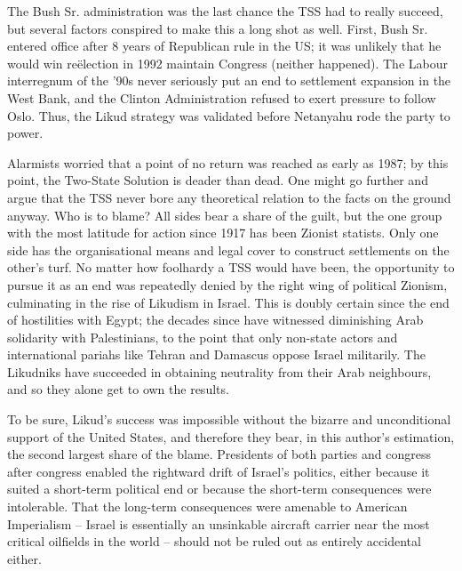 \documentclass[letterpaper,12pt,twoside]{article} %
\begin{document}
\begin{multicols}{2}
The Bush Sr. administration was the last chance the TSS had to really succeed, but several factors conspired to make this a long shot as well. First, Bush Sr. entered office after 8 years of Republican rule in the US; it was unlikely that he would win reëlection in 1992  maintain Congress (neither happened). The Labour interregnum of the '90s never seriously put an end to settlement expansion in the West Bank, and the Clinton Administration refused to exert pressure to follow Oslo. Thus, the Likud strategy was validated before Netanyahu rode the party to power.

Alarmists worried that a point of no return was reached as early as 1987; by this point, the Two-State Solution is deader than dead. One might go further and argue that the TSS never bore any theoretical relation to the facts on the ground anyway. Who is to blame? All sides bear a share of the guilt, but the one group with the most latitude for action since 1917 has been Zionist statists. Only one side has the organisational means and legal cover to construct settlements on the other's turf. No matter how foolhardy a TSS would have been, the opportunity to pursue it as an end was repeatedly denied by the right wing of political Zionism, culminating in the rise of Likudism in Israel. This is doubly certain since the end of hostilities with Egypt; the decades since have witnessed diminishing Arab solidarity with Palestinians, to the point that only non-state actors and international pariahs like Tehran and Damascus oppose Israel militarily. The Likudniks have succeeded in obtaining neutrality from their Arab neighbours, and so they alone get to own the results.

To be sure, Likud's success was impossible without the bizarre and unconditional support of the United States, and therefore they bear, in this author's estimation, the second largest share of the blame. Presidents of both parties and congress after congress enabled the rightward drift of Israel's politics, either because it suited a short-term political end or because the short-term consequences were intolerable. That the long-term consequences were amenable to American Imperialism -- Israel is essentially an unsinkable aircraft carrier near the most critical oilfields in the world -- should not be ruled out as entirely accidental either. 



\end{multicols}

\nocite{kelman2018onetwo}
\nocite{lustick2019paradigm}
\nocite{kear2022wasatiyyah}
\nocite{omalley2017israel}
\nocite{scheindlin2016confederalism}
\nocite{munayyer2019there}
\nocite{gordon2012western}
\nocite{farsakh2011one}

\vfill
\pagebreak
\printbibliography
\end{document}
